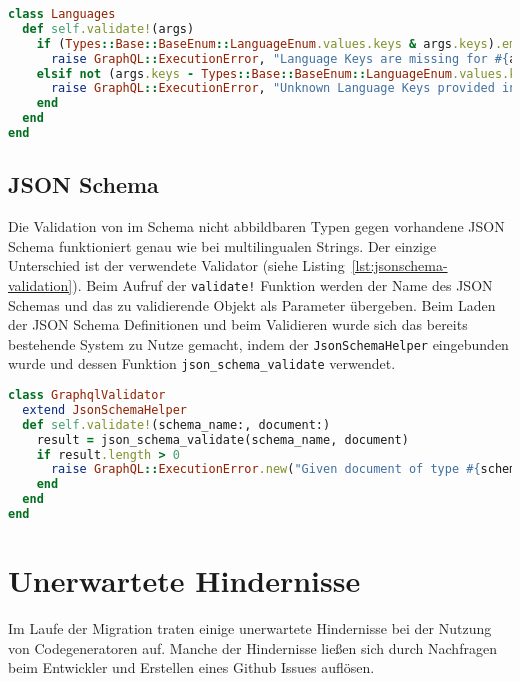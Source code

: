 \begin{lstlisting}[language=Ruby,float=h!,caption={Validator Klasse zum Prüfen, ob der übergebene Parameter die Beschaffenheit eines multilingualen Strings aufweist. \lstinline|/graphql/validators/languages.rb|}, label={lst:multilang-validation}]
class Languages
  def self.validate!(args)
    if (Types::Base::BaseEnum::LanguageEnum.values.keys & args.keys).empty?
      raise GraphQL::ExecutionError, "Language Keys are missing for #{args}"
    elsif not (args.keys - Types::Base::BaseEnum::LanguageEnum.values.keys).empty?
      raise GraphQL::ExecutionError, "Unknown Language Keys provided in #{args}"
    end
  end
end
\end{lstlisting}

\subsection{JSON Schema}
\label{sec:impl:json-schema-validation}
Die Validation von im Schema nicht abbildbaren Typen gegen vorhandene JSON Schema funktioniert genau wie bei multilingualen Strings. Der einzige Unterschied ist der verwendete Validator (siehe Listing~\ref{lst:jsonschema-validation}). Beim Aufruf der \texttt{validate!} Funktion werden der Name des JSON Schemas und das zu validierende Objekt  als Parameter übergeben. Beim Laden der JSON Schema Definitionen und beim Validieren wurde sich das bereits bestehende System zu Nutze gemacht, indem der \texttt{JsonSchemaHelper} eingebunden wurde und dessen Funktion \texttt{json\_schema\_validate} verwendet. 

\begin{lstlisting}[language=Ruby,float=h!,caption={Validator Klasse zum Prüfen, ob der übergebene Parameter die Beschaffenheit des JSON Schema aufweist. \lstinline|/graphql/validators/graphql_validator.rb|}, label={lst:jsonschema-validation}]
class GraphqlValidator
  extend JsonSchemaHelper
  def self.validate!(schema_name:, document:)
    result = json_schema_validate(schema_name, document)
    if result.length > 0
      raise GraphQL::ExecutionError.new("Given document of type #{schema_name} does not match the schema[...]", extensions: { code: 'VALIDATION' })
    end
  end
end
\end{lstlisting}

\section{Unerwartete Hindernisse}
Im Laufe der Migration traten einige unerwartete Hindernisse bei der Nutzung von Codegeneratoren auf. Manche der Hindernisse ließen sich durch Nachfragen beim Entwickler und Erstellen eines Github Issues auflösen.

